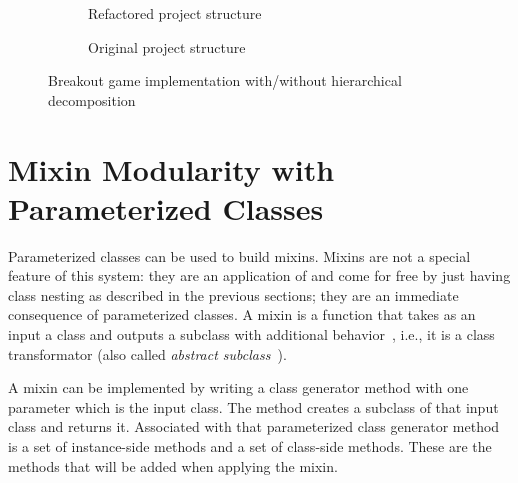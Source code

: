 \begin{figure}[!htp]
\begin{subfigure}[b]{0.45\textwidth}
\caption{Refactored project structure}
\end{subfigure}
\qquad
\begin{subfigure}[b]{0.45\textwidth}
\caption{Original project structure}
\end{subfigure}
\caption{Breakout game implementation with/without hierarchical decomposition}
\label{fig:usecase_breakout_game}
\end{figure}


\section{Mixin Modularity with Parameterized Classes}
Parameterized classes can be used to build mixins. Mixins are not a special feature of this system: they are an application of \msname and come for free by just having class nesting as described in the previous sections; they are an immediate consequence of parameterized classes. A mixin is a function that takes as an input a class and outputs a subclass with additional behavior~\cite{bracha1992programming, Bettini:2004:CCH:967900.968200}, i.e., it is a class transformator (also called \emph{abstract subclass}~\cite{Bracha:1990:MI:97945.97982}). 

A mixin can be implemented by writing a class generator method with one parameter which is the input class. The method creates a subclass of that input class and returns it. Associated with that parameterized class generator method is a set of instance-side methods and a set of class-side methods. These are the methods that will be added when applying the mixin.

